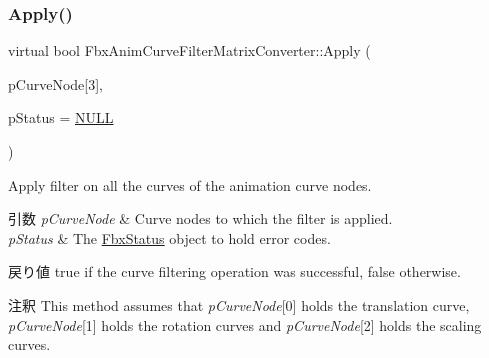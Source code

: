 \subsubsection{\texorpdfstring{Apply()}{Apply()}\hspace{0.1cm}{\footnotesize\ttfamily [4/7]}}
{\footnotesize\ttfamily virtual bool Fbx\+Anim\+Curve\+Filter\+Matrix\+Converter\+::\+Apply (\begin{DoxyParamCaption}\item[{\hyperlink{class_fbx_anim_curve_node}{Fbx\+Anim\+Curve\+Node} $\ast$}]{p\+Curve\+Node\mbox{[}3\mbox{]},  }\item[{\hyperlink{class_fbx_status}{Fbx\+Status} $\ast$}]{p\+Status = {\ttfamily \hyperlink{fbxarch_8h_a070d2ce7b6bb7e5c05602aa8c308d0c4}{N\+U\+LL}} }\end{DoxyParamCaption})\hspace{0.3cm}{\ttfamily [virtual]}}

Apply filter on all the curves of the animation curve nodes. 
\begin{DoxyParams}{引数}
{\em p\+Curve\+Node} & Curve nodes to which the filter is applied. \\
\hline
{\em p\+Status} & The \hyperlink{class_fbx_status}{Fbx\+Status} object to hold error codes. \\
\hline
\end{DoxyParams}
\begin{DoxyReturn}{戻り値}
{\ttfamily true} if the curve filtering operation was successful, {\ttfamily false} otherwise. 
\end{DoxyReturn}
\begin{DoxyRemark}{注釈}
This method assumes that {\itshape p\+Curve\+Node}\mbox{[}0\mbox{]} holds the translation curve, {\itshape p\+Curve\+Node}\mbox{[}1\mbox{]} holds the rotation curves and {\itshape p\+Curve\+Node}\mbox{[}2\mbox{]} holds the scaling curves. 
\end{DoxyRemark}
\mbox{\label{class_fbx_anim_curve_filter_matrix_converter_a30599e88b210af2fa8c7be727d59fae8}} 
